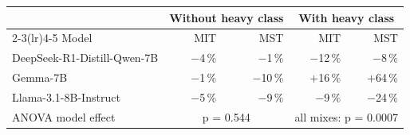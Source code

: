 \begin{tabular}{lrrrr}
\toprule
 & \multicolumn{2}{c}{Without heavy class} & \multicolumn{2}{c}{With heavy class} \\
\cmidrule(lr){2-3}\cmidrule(lr){4-5}
Model & MIT & MST & MIT & MST \\
\midrule
DeepSeek-R1-Distill-Qwen-7B & \ensuremath{-}4\,\% & \ensuremath{-}1\,\% & \ensuremath{-}12\,\% & \ensuremath{-}8\,\% \\
Gemma-7B & \ensuremath{-}1\,\% & \ensuremath{-}10\,\% & +16\,\% & +64\,\% \\
Llama-3.1-8B-Instruct & \ensuremath{-}5\,\% & \ensuremath{-}9\,\% & \ensuremath{-}9\,\% & \ensuremath{-}24\,\% \\
\midrule
ANOVA model effect & \multicolumn{2}{c}{p = 0.544} & \multicolumn{2}{c}{all mixes: p = 0.0007} \\
\bottomrule
\end{tabular}

